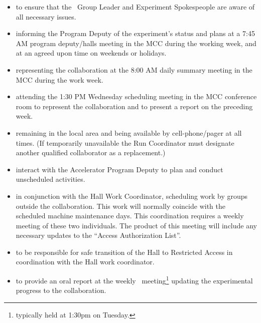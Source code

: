 \documentclass[11pt]{article}
\begin{document}
\begin{itemize}

\item to ensure that the \HALL\ Group Leader and Experiment
Spokespeople are  aware of all necessary issues.

\item informing the Program Deputy of the experiment's status and plans at 
a 7:45 AM program deputy/halls meeting in the MCC during the working week, and at an agreed
upon time on weekends or holidays.

\item representing the collaboration at the 8:00 AM daily summary meeting in the MCC
during the work week. 

\item attending the 1:30 PM Wednesday scheduling meeting in the MCC conference 
room to represent the collaboration and to present a report on the
preceding week.

\item remaining in the local area and being available by cell-phone/pager 
at all times.  (If temporarily unavailable the Run Coordinator must designate another 
qualified collaborator as a replacement.)


\item interact with the Accelerator Program Deputy to plan and conduct
unscheduled activities.

\item in conjunction with the Hall Work Coordinator, scheduling
work by groups outside the collaboration. This work will
normally coincide with the scheduled  machine maintenance days.
This coordination requires a weekly meeting of these  two
individuals. The product of this meeting will include any necessary
updates to the ``Access  Authorization List''.

\item to be responsible for safe transition of the Hall to
Restricted Access in coordination with the Hall work
coordinator.

\item to provide an oral report at the weekly \HALL\
meeting\footnote{typically held at 1:30pm on Tuesday.} updating the
experimental progress to the collaboration.


\end{itemize}
\end{document}
